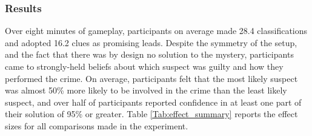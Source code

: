 \documentclass{article}
\begin{document}
\subsubsection{Results}
Over eight minutes of gameplay, participants on average made 28.4 classifications and adopted 16.2 clues as promising leads. 
Despite the symmetry of the setup, and the fact that there was by design no solution to the mystery, participants came to strongly-held beliefs about which suspect was guilty and how they performed the crime. On average, participants felt that the most likely suspect was almost 50\% more likely to be involved in the crime than the least likely suspect, and over half of participants reported confidence in at least one part of their solution of 95\% or greater. Table \ref{Tab:effect_summary} reports the effect sizes for all comparisons made in the experiment.
\end{document}

